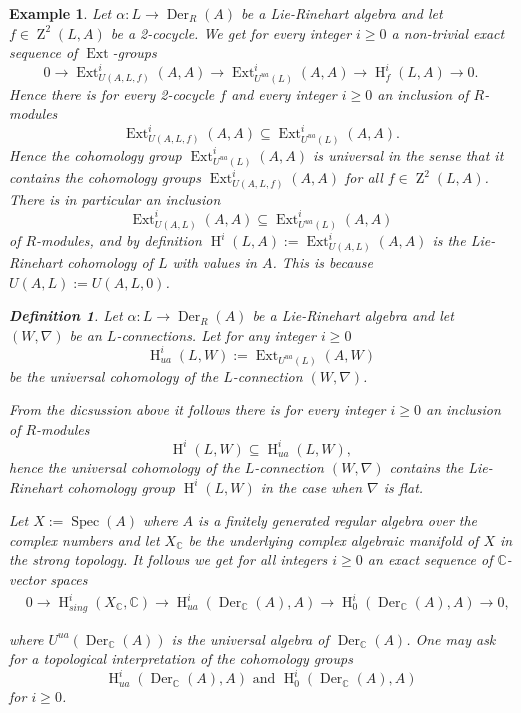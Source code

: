\documentclass{amsart}
\theoremstyle{plain}
\newtheorem{example}[theorem]{Example}
\theoremstyle{definition}
\newtheorem{definition}[theorem]{Definition}
\theoremstyle{remark}
\numberwithin{equation}{theorem}
\begin{document}
\begin{example} 

Let $\alpha:L\rightarrow {\operatorname{Der} }_{R}(A)$ be a Lie-Rinehart algebra and let $f\in {\operatorname{Z}}^2(L,A)$ be a 2-cocycle.
We get for every integer $i\geq 0$ a non-trivial exact sequence of ${\operatorname{Ext} }$-groups
\[ 0\rightarrow {\operatorname{Ext} }_{U(A,L,f)}^i(A,A) \rightarrow {\operatorname{Ext} }_{{U^{ua}}(L)}^i(A,A)\rightarrow {\operatorname{H} }^i_f(L,A)\rightarrow 0.\]
Hence there is for every 2-cocycle $f$ and every integer $i\geq 0$ an inclusion of $R$-modules
\[ {\operatorname{Ext} }_{U(A,L,f)}^i(A,A) \subseteq {\operatorname{Ext} }_{{U^{ua}}(L)}^i(A,A).\]
Hence the cohomology group ${\operatorname{Ext} }_{{U^{ua}}(L)}^i(A,A)$ is \emph{universal} in the sense that it contains
the cohomology groups ${\operatorname{Ext} }_{U(A,L,f)}^i(A,A)$ for all $f\in {\operatorname{Z}}^2(L,A)$. There is in particular an inclusion
\[ {\operatorname{Ext} }^i_{U(A,L)}(A,A)\subseteq {\operatorname{Ext} }^i_{{U^{ua}}(L)}(A,A) \]
of $R$-modules, and by definition ${\operatorname{H} }^i(L,A):={\operatorname{Ext} }^i_{U(A,L)}(A,A)$ is the Lie-Rinehart cohomology of $L$ with values
in $A$. This is because $U(A,L):=U(A,L,0)$.

\begin{definition} Let $\alpha:L\rightarrow {\operatorname{Der} }_R(A)$ be a Lie-Rinehart algebra and let $(W,\nabla)$ be an $L$-connections.
Let for any integer $i\geq 0$
\[ {\operatorname{H} }^i_{ua}(L,W):={\operatorname{Ext} }_{{U^{ua}}(L)}(A,W) \]
be the \emph{universal cohomology} of the $L$-connection $(W,\nabla)$.
\end{definition}
From the dicsussion above it follows there is for every integer $i\geq 0$ an inclusion of $R$-modules
\[ {\operatorname{H} }^i(L,W)\subseteq {\operatorname{H} }^i_{ua}(L,W), \]
hence the universal cohomology of the $L$-connection $(W,\nabla)$ contains the Lie-Rinehart cohomology group
${\operatorname{H} }^i(L,W)$ in the case when $\nabla$ is flat.

Let $X:={\operatorname{Spec} }(A)$ where $A$ is a finitely generated regular algebra over the complex numbers and let
$X_{\mathbb{C} }$ be the underlying complex algebraic manifold of $X$ in the strong topology. It follows we get
for all integers $i\geq 0$ an exact sequence of ${\mathbb{C} }$-vector spaces
\begin{align}
&\label{ext} 0 \rightarrow {\operatorname{H} }^i_{sing}(X_{\mathbb{C} }, {\mathbb{C} }) \rightarrow {\operatorname{H} }^i_{ua}({\operatorname{Der} }_{\mathbb{C} }(A),A) 
\rightarrow {\operatorname{H} }^i_0({\operatorname{Der} }_{\mathbb{C} }(A),A)\rightarrow 0, 
\end{align}

where ${U^{ua}}({\operatorname{Der} }_{\mathbb{C} }(A))$ is the universal algebra of ${\operatorname{Der} }_{\mathbb{C} }(A)$. 
One may ask for a topological interpretation of the cohomology groups 
\[ {\operatorname{H} }^i_{ua}({\operatorname{Der} }_{\mathbb{C} }(A), A)\text{ and }{\operatorname{H} }^i_0({\operatorname{Der} }_{\mathbb{C} }(A),A) \]
for $i\geq 0$. 
\end{example}
\end{document}
